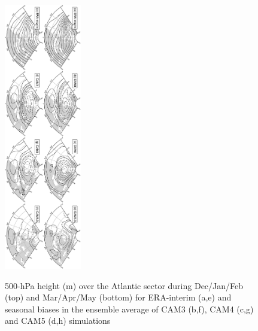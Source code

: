 \documentclass[12pt,varwidth]{article}
\begin{document}

{}
{\clearpage}


\pagebreak


\begin{figure}[t]
  \begin{center}
    \noindent\includegraphics[width=0.3\textwidth,angle=90.]{./figs/f_mean_Z500_atl.pdf}\\
  \end{center}
  \caption{500-hPa height (m) over the Atlantic sector during Dec/Jan/Feb (top) and Mar/Apr/May (bottom) for ERA-interim (a,e) and seasonal biases in the ensemble average of CAM3 (b,f), CAM4 (c,g) and CAM5 (d,h) simulations}
\label{f_mean_Z500_atl}
\end{figure}
\end{document}
